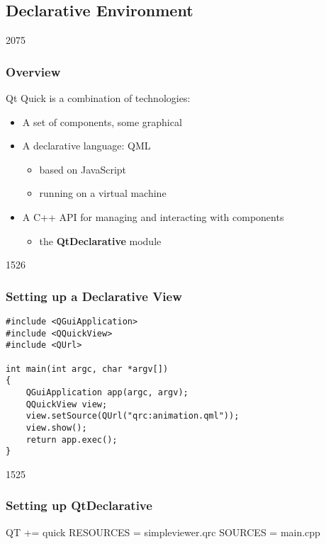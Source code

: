 %
%
%
%

\subsection{Declarative Environment}

\begin{slide}{2075}\frametitle{Overview}

Qt Quick is a combination of technologies:

\begin{itemize}
\item A set of components, some graphical
\item A declarative language: QML
  \begin{itemize}
  \item based on JavaScript
  \item running on a virtual machine
  \end{itemize}
\item A C++ API for managing and interacting with components
  \begin{itemize}
  \item the \textbf{QtDeclarative} module
  \end{itemize}
\end{itemize}

\end{slide}

\begin{slide}[fragile]{1526}\frametitle{Setting up a Declarative View}

\begin{lstlisting}
#include <QGuiApplication>
#include <QQuickView>
#include <QUrl>

int main(int argc, char *argv[])
{
    QGuiApplication app(argc, argv);
    QQuickView view;
    view.setSource(QUrl("qrc:animation.qml"));
    view.show();
    return app.exec();
}
\end{lstlisting}

\end{slide}

\begin{slide}[fragile]{1525}\frametitle{Setting up QtDeclarative}

\begin{qmake}
QT       += quick
RESOURCES = simpleviewer.qrc
SOURCES   = main.cpp
\end{qmake}

\end{slide}

